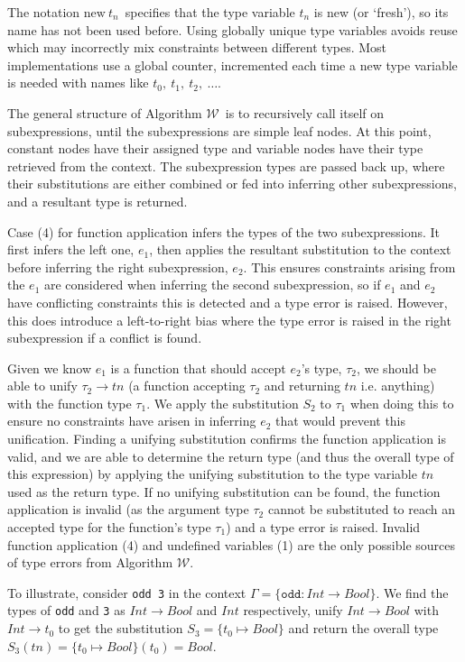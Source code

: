 \documentclass[a4paper,fleqn,oneside,12pt]{report}
\newcommand{\W}{$\mathcal{W}$}
\begin{document}
The notation $\textrm{new}\ t_n$\ specifies that the type variable $t_n$ is new (or `fresh'), so its name has not been used before. Using globally unique type variables avoids reuse which may incorrectly mix constraints between different types. Most implementations use a global counter, incremented each time a new type variable is needed with names like $t_0,\ t_1,\ t_2,\ \dots$.

The general structure of Algorithm \W\ is to recursively call itself on subexpressions, until the subexpressions are simple leaf nodes. At this point, constant nodes have their assigned type and variable nodes have their type retrieved from the context. The subexpression types are passed back up, where their substitutions are either combined or fed into inferring other subexpressions, and a resultant type is returned.

Case (4) for function application infers the types of the two subexpressions. It first infers the left one, $e_1$, then applies the resultant substitution to the context before inferring the right subexpression, $e_2$. This ensures constraints arising from the $e_1$ are considered when inferring the second subexpression, so if $e_1$ and $e_2$ have conflicting constraints this is detected and a type error is raised. However, this does introduce a left-to-right bias where the type error is raised in the right subexpression if a conflict is found.

Given we know $e_1$ is a function that should accept $e_2$'s type, $\tau_2$, we should be able to unify $\tau_2 \rightarrow tn$ (a function accepting $\tau_2$ and returning $tn$ i.e. anything) with the function type $\tau_1$. We apply the substitution $S_2$ to $\tau_1$ when doing this to ensure no constraints have arisen in inferring $e_2$ that would prevent this unification. Finding a unifying substitution confirms the function application is valid, and we are able to determine the return type (and thus the overall type of this expression) by applying the unifying substitution to the type variable $tn$ used as the return type. If no unifying substitution can be found, the function application is invalid (as the argument type $\tau_2$ cannot be substituted to reach an accepted type for the function’s type $\tau_1$) and a type error is raised. Invalid function application (4) and undefined variables (1) are the only possible sources of type errors from Algorithm \W.

To illustrate, consider \texttt{odd 3} in the context $\Gamma = \{ \mathtt{odd} : Int \rightarrow Bool \}$. We find the types of \texttt{odd} and \texttt{3} as $Int \rightarrow Bool$ and $Int$ respectively, unify $Int \rightarrow Bool$ with $Int \rightarrow t_0$ to get the substitution $S_3 = \{ t_0 \mapsto Bool \}$ and return the overall type $S_3(tn) = \{ t_0 \mapsto Bool \}(t_0) = Bool$.
\end{document}
